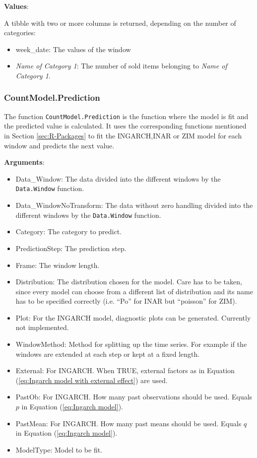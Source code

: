 \textbf{Values}:

A tibble with two or more columns is returned, depending on the number of categories: 

\begin{itemize}
	\item week\_date: The values of the window
	\item \textit{Name of Category 1}: The number of sold items belonging to \textit{Name of Category 1}.
\end{itemize}

\subsubsection{CountModel.Prediction}
\label{sec:CountModel.Prediction}

The function \texttt{CountModel.Prediction} is the function where the model is fit and the predicted value is calculated. It uses the corresponding functions mentioned in Section \ref{sec:R-Packages} to fit the INGARCH,INAR or ZIM model for each window and predicts the next value. 

\textbf{Arguments}:

\begin{itemize}
	\item Data\_Window: The data divided into the different windows by the \texttt{Data.Window} function.
	\item Data\_WindowNoTransform: The data without zero handling divided into the different windows by the \texttt{Data.Window} function.
  \item Category: The category to predict. 
  \item PredictionStep: The prediction step.
  \item Frame: The window length.
  \item Distribution: The distribution chosen for the model. Care has to be taken, since every model can choose from a different list of distribution and its name has to be specified correctly (i.e. "`Po"' for INAR but "`poisson"' for ZIM). 
  \item Plot: For the INGARCH model, diagnostic plots can be generated. Currently not implemented.
  \item WindowMethod: Method for splitting up the time series. For example if the windows are extended at each step or kept at a fixed length.
  \item External: For INGARCH. When TRUE, external factors as in Equation (\ref{eq:Ingarch model with external effect}) are used.
  \item PastOb: For INGARCH. How many past observations should be used. Equals $p$ in Equation (\ref{eq:Ingarch model}).
  \item PastMean: For INGARCH. How many past means should be used. Equals $q$ in Equation (\ref{eq:Ingarch model}).
  \item ModelType: Model to be fit. 
\end{itemize}

